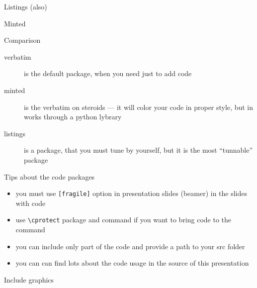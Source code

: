 \begin{frame}[fragile]{Listings (also)}\relax

\cprotect{}
\end{frame}

\begin{frame}[fragile]{Minted}\relax

\cprotect{}
\end{frame}

\begin{frame}[fragile]{Comparison}\relax
    \begin{description}
         \item[verbatim] is the default package, when you need just to add code 
         \item[minted] is the verbatim on steroids --- it will color your code in proper style, but in works through a python lybrary
         \item[listings] is a package, that you must tune by yourself, but it is the most ``tunnable'' package
    \end{description}
    
\end{frame}

\begin{frame}[fragile]{Tips about the code packages}\relax
    \begin{itemize}
         \item you must use {\csk \verb|[fragile]|} option in presentation slides (beamer) in the slides with code 
         \item use {\csk \verb|\cprotect|} package and command if you want to bring code to the command
         \item you can include only part of the code and provide a path to your src folder
         \item you can can find lots about the code usage in the source of this presentation  
    \end{itemize}
\end{frame}

\begin{frame}[fragile]{Include graphics}\relax
     \cprotect{}

\end{frame}

